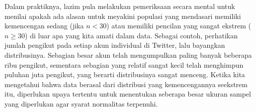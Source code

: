 
Dalam praktiknya, lazim pula melakukan pemeriksaan secara mental untuk menilai
apakah ada alasan untuk meyakini populasi yang mendasari
memiliki kemencengan sedang (jika $n < 30$)
atau memiliki pencilan yang sangat ekstrem ($n \geq 30$)
di luar apa yang kita amati dalam data.
Sebagai contoh, perhatikan jumlah pengikut
pada setiap akun individual di Twitter,
lalu bayangkan distribusinya.
Sebagian besar akun telah mengumpulkan
paling banyak beberapa ribu pengikut,
sementara sebagian yang relatif sangat kecil telah menghimpun
puluhan juta pengikut,
yang berarti distribusinya sangat menceng.
Ketika kita mengetahui bahwa data berasal dari distribusi
yang kemencengannya seekstrem itu,
diperlukan upaya tertentu untuk menentukan seberapa besar
ukuran sampel yang diperlukan agar syarat normalitas
terpenuhi.





